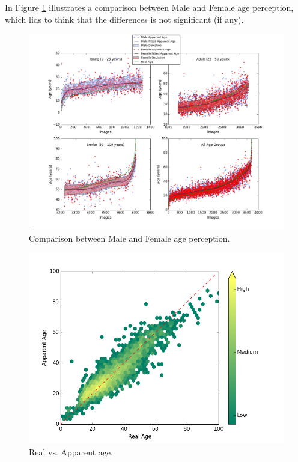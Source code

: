 In Figure \ref{fig:gender} illustrates a comparison between Male and Female age perception, which lids to think that the differences is not significant (if any).

\begin{figure}[h!]
	\centering
	\includegraphics[width=\textwidth]{figures/Labels_across_img_gender}
	\caption{Comparison between Male and Female age perception.}
	\label{fig:gender}
\end{figure}

\begin{figure}[h!]
	\centering
	\includegraphics[width=\textwidth]{figures/real_vs_apparent_summer}
	\caption{Real vs. Apparent age.}
	\label{fig:RvsA}
\end{figure}

